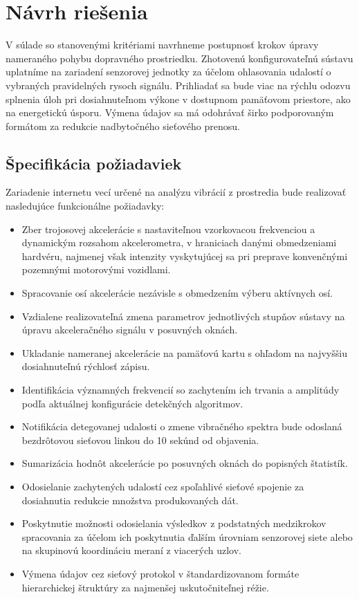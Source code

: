 \chapter{Návrh riešenia}
V súlade so stanovenými kritériami navrhneme postupnosť krokov úpravy nameraného pohybu dopravného prostriedku.
Zhotovenú konfigurovateľnú sústavu uplatníme na zariadení senzorovej jednotky za účelom ohlasovania udalostí
o vybraných pravidelných rysoch signálu. Prihliadať sa bude viac na rýchlu odozvu splnenia úloh pri
dosiahnuteľnom výkone v dostupnom pamäťovom priestore, ako na energetickú úsporu. Výmena údajov sa má
odohrávať širko podporovaným formátom za redukcie nadbytočného sieťového prenosu.

\section{Špecifikácia požiadaviek}
Zariadenie internetu vecí určené na analýzu vibrácií z prostredia bude realizovať nasledujúce funkcionálne požiadavky:
\begin{itemize}[noitemsep,topsep=0pt]
\item Zber trojosovej akcelerácie s nastaviteľnou vzorkovacou frekvenciou a dynamickým rozsahom akcelerometra, v hraniciach danými
obmedzeniami hardvéru, najmenej však intenzity vyskytujúcej sa pri preprave konvenčnými pozemnými motorovými vozidlami.
\item Spracovanie osí akcelerácie nezávisle s obmedzením výberu aktívnych osí.
\item Vzdialene realizovateľná zmena parametrov jednotlivých stupňov sústavy na úpravu akceleračného signálu v posuvných oknách.
\item Ukladanie nameranej akcelerácie na pamäťovú kartu s ohľadom na najvyššiu dosiahnuteľnú rýchlosť zápisu.
\item Identifikácia významných frekvencií so zachytením ich trvania a amplitúdy podľa aktuálnej
konfigurácie detekčných algoritmov.
\item Notifikácia detegovanej udalosti o zmene vibračného spektra bude odoslaná bezdrôtovou sieťovou linkou do 10 sekúnd od objavenia.
\item Sumarizácia hodnôt akcelerácie po posuvných oknách do popisných štatistík.
\item Odosielanie zachytených udalostí cez spoľahlivé sieťové spojenie za dosiahnutia redukcie množstva produkovaných dát.
\item Poskytnutie možnosti odosielania výsledkov z podstatných medzikrokov spracovania za účelom ich poskytnutia
ďalším úrovniam senzorovej siete alebo na skupinovú koordináciu meraní z viacerých uzlov.
\item Výmena údajov cez sieťový protokol v štandardizovanom formáte hierarchickej štruktúry za najmenšej uskutočniteľnej réžie.
\end{itemize}
\bigskip

